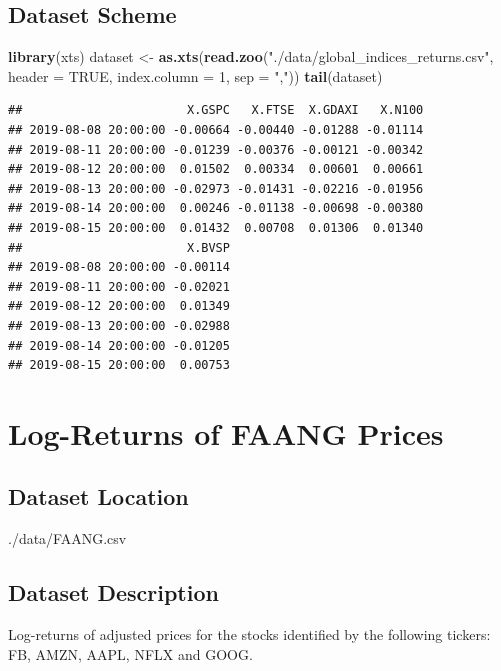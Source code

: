 \documentclass[]{book}
\newenvironment{Shaded}{\begin{snugshade}}{\end{snugshade}}
\newcommand{\KeywordTok}[1]{\textcolor[rgb]{0.13,0.29,0.53}{\textbf{#1}}}
\newcommand{\DataTypeTok}[1]{\textcolor[rgb]{0.13,0.29,0.53}{#1}}
\newcommand{\DecValTok}[1]{\textcolor[rgb]{0.00,0.00,0.81}{#1}}
\newcommand{\StringTok}[1]{\textcolor[rgb]{0.31,0.60,0.02}{#1}}
\newcommand{\OtherTok}[1]{\textcolor[rgb]{0.56,0.35,0.01}{#1}}
\newcommand{\NormalTok}[1]{#1}
\theoremstyle{definition}
\theoremstyle{definition}
\theoremstyle{definition}
\theoremstyle{remark}
\begin{document}
\subsection{Dataset Scheme}\label{dataset-scheme}

\begin{Shaded}
\begin{Highlighting}[]
\KeywordTok{library}\NormalTok{(xts)}
\NormalTok{dataset <-}\StringTok{ }\KeywordTok{as.xts}\NormalTok{(}\KeywordTok{read.zoo}\NormalTok{(}\StringTok{"./data/global_indices_returns.csv"}\NormalTok{, }
  \DataTypeTok{header =} \OtherTok{TRUE}\NormalTok{, }\DataTypeTok{index.column =} \DecValTok{1}\NormalTok{, }\DataTypeTok{sep =} \StringTok{","}\NormalTok{))}
\KeywordTok{tail}\NormalTok{(dataset)}
\end{Highlighting}
\end{Shaded}

\begin{verbatim}
##                       X.GSPC   X.FTSE  X.GDAXI   X.N100
## 2019-08-08 20:00:00 -0.00664 -0.00440 -0.01288 -0.01114
## 2019-08-11 20:00:00 -0.01239 -0.00376 -0.00121 -0.00342
## 2019-08-12 20:00:00  0.01502  0.00334  0.00601  0.00661
## 2019-08-13 20:00:00 -0.02973 -0.01431 -0.02216 -0.01956
## 2019-08-14 20:00:00  0.00246 -0.01138 -0.00698 -0.00380
## 2019-08-15 20:00:00  0.01432  0.00708  0.01306  0.01340
##                       X.BVSP
## 2019-08-08 20:00:00 -0.00114
## 2019-08-11 20:00:00 -0.02021
## 2019-08-12 20:00:00  0.01349
## 2019-08-13 20:00:00 -0.02988
## 2019-08-14 20:00:00 -0.01205
## 2019-08-15 20:00:00  0.00753
\end{verbatim}

\section{Log-Returns of FAANG Prices}\label{dt-FAANG}

\subsection{Dataset Location}\label{dataset-location-1}

./data/FAANG.csv

\subsection{Dataset Description}\label{dataset-description-1}

Log-returns of adjusted prices for the stocks identified by the
following tickers: FB, AMZN, AAPL, NFLX and GOOG.
\end{document}
